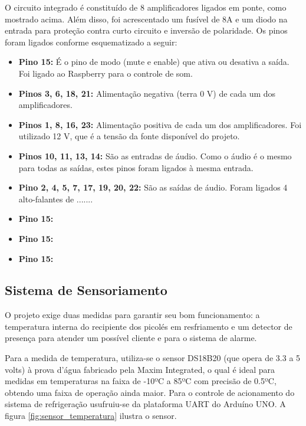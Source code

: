 O circuito integrado é constituído de 8 amplificadores ligados em ponte, como mostrado acima. Além disso, foi acrescentado um fusível de 8A e um diodo na entrada para proteção contra curto circuito e inversão de polaridade. Os pinos foram ligados conforme esquematizado a seguir:

\begin{itemize}
	\item \textbf{Pino 15:} É o pino de modo (mute e enable) que ativa ou desativa a saída. Foi ligado ao Raspberry para o controle de som.
    \item \textbf{Pinos 3, 6, 18, 21:} Alimentação negativa (terra 0 V) de cada um dos amplificadores.
    \item \textbf{Pinos 1, 8, 16, 23:} Alimentação positiva de cada um dos amplificadores. Foi utilizado 12 V, que é a tensão da fonte disponível do projeto.
    \item \textbf{Pinos 10, 11, 13, 14:} São as entradas de áudio. Como o áudio é o mesmo para todas as saídas, estes pinos foram ligados à mesma entrada.
    \item \textbf{Pino 2, 4, 5, 7, 17, 19, 20, 22:} São as saídas de áudio. Foram ligados 4 alto-falantes de .......
    
    \item \textbf{Pino 15:}
    \item \textbf{Pino 15:}
    \item \textbf{Pino 15:}
\end{itemize}

\subsection{Sistema de Sensoriamento}

O projeto exige duas medidas para garantir seu bom funcionamento: a temperatura interna do recipiente dos picolés em resfriamento e um detector de presença para atender um possível cliente e para o sistema de alarme. 

	Para a medida de temperatura, utiliza-se o sensor DS18B20 (que opera de 3.3 a 5 volts) à prova d'água fabricado pela Maxim Integrated, o qual é ideal para medidas em temperaturas na faixa de -10ºC a 85ºC com precisão de 0.5ºC, obtendo uma faixa de operação ainda maior. Para o controle de acionamento do sistema de refrigeração usufruiu-se da plataforma UART do Arduíno UNO. A figura \ref{fig:sensor_temperatura} ilustra o sensor.
    
